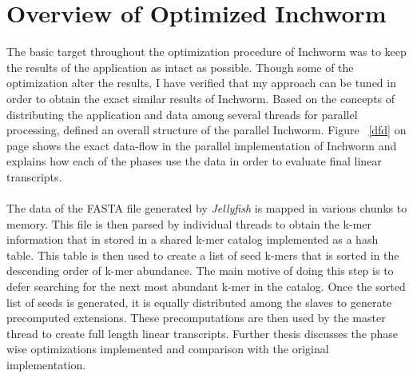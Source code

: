 \label{key}\documentclass[bachinf, english ,zihtitle,final,hyperref,utf8]{zihpub}
\begin{document}
\section{Overview of Optimized Inchworm}
The basic target throughout the optimization procedure of Inchworm was to keep the results of the application as intact as possible. Though some of the optimization alter the results, I have verified that my approach can be tuned in order to obtain the exact similar results of Inchworm. Based on the concepts of distributing the application and data among several threads for parallel processing, defined an overall structure of the parallel Inchworm. Figure ~\ref{dfd} on page \pageref{dfd} shows the exact data-flow in the parallel implementation of Inchworm and explains how each of the phases use the data in order to evaluate final linear transcripts. 
\paragraph{}
The data of the FASTA file generated by \emph{Jellyfish} is mapped in various chunks to memory. This file is then parsed by individual threads to obtain the k-mer information that in stored in a shared k-mer catalog implemented as a hash table. This table is then used to create a list of seed k-mers that is sorted in the descending order of k-mer abundance. The main motive of doing this step is to defer searching for the next most abundant k-mer in the catalog. Once the sorted list of seeds is generated, it is equally distributed among the slaves to generate precomputed extensions. These precomputations are then used by the master thread to create full length linear transcripts. Further thesis discusses the phase wise optimizations implemented and comparison with the original implementation.
\end{document}
